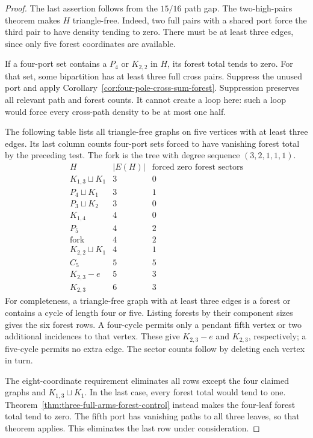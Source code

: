 \begin{proof}
The last assertion follows from the $15/16$ path gap.
The two-high-pairs theorem makes $H$ triangle-free.
Indeed, two full pairs with a shared port force the third pair to have density tending to zero.
There must be at least three edges, since only five forest coordinates are available.

If a four-port set contains a $P_4$ or $K_{2,2}$ in $H$, its forest total tends to zero.
For that set, some bipartition has at least three full cross pairs.
Suppress the unused port and apply Corollary~\ref{cor:four-pole-cross-sum-forest}.
Suppression preserves all relevant path and forest counts.
It cannot create a loop here: such a loop would force every cross-path density to be at most one half.

The following table lists all triangle-free graphs on five vertices with at least three edges.
Its last column counts four-port sets forced to have vanishing forest total by the preceding test.
The fork is the tree with degree sequence $(3,2,1,1,1)$.
\[
\begin{array}{c|c|c}
 H&|E(H)|&\text{forced zero forest sectors}\\ \hline
 K_{1,3}\sqcup K_1&3&0\\
 P_4\sqcup K_1&3&1\\
 P_3\sqcup K_2&3&0\\
 K_{1,4}&4&0\\
 P_5&4&2\\
 \text{fork}&4&2\\
 K_{2,2}\sqcup K_1&4&1\\
 C_5&5&5\\
 K_{2,3}-e&5&3\\
 K_{2,3}&6&3
\end{array}
\]
For completeness, a triangle-free graph with at least three edges is a forest or contains a cycle of length four or five.
Listing forests by their component sizes gives the six forest rows.
A four-cycle permits only a pendant fifth vertex or two additional incidences to that vertex.
These give $K_{2,3}-e$ and $K_{2,3}$, respectively; a five-cycle permits no extra edge.
The sector counts follow by deleting each vertex in turn.

The eight-coordinate requirement eliminates all rows except the four claimed graphs and $K_{1,3}\sqcup K_1$.
In the last case, every forest total would tend to one.
Theorem~\ref{thm:three-full-arms-forest-control} instead makes the four-leaf forest total tend to zero.
The fifth port has vanishing paths to all three leaves, so that theorem applies.
This eliminates the last row under consideration.
\end{proof}

